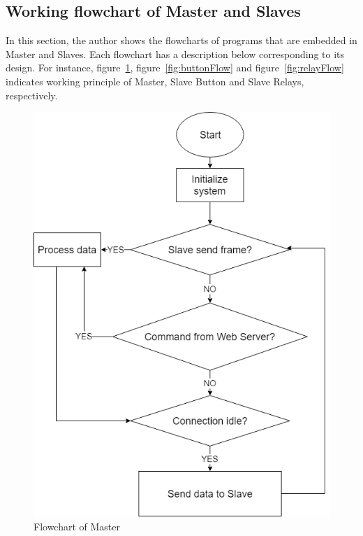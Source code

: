     \subsection{Working flowchart of Master and Slaves}
    In this section, the author shows the flowcharts of programs that are embedded in Master and Slaves. Each flowchart has a description below corresponding to its design. For instance, figure~\ref{fig:masterFlow}, figure~\ref{fig:buttonFlow} and figure~\ref{fig:relayFlow} indicates working principle of Master, Slave Button and Slave Relays, respectively.
    \begin{figure}[!htbp]
        \begin{center}
        \includegraphics[scale=0.75]{images/masterFlow.png}
        \caption{Flowchart of Master}
        \label{fig:masterFlow}
        \end{center}
    \end{figure}
